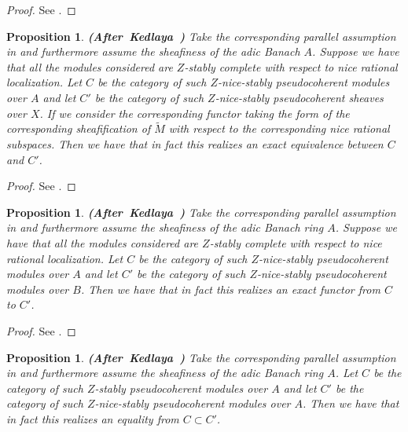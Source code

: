 \documentclass[12pt]{amsart}
\newtheorem{proposition}[theorem]{Proposition}
\theoremstyle{definition}
\numberwithin{equation}{section}
\begin{document}
\begin{proof}
See \cite[Lemma 1.9.13]{Ked2}.	
\end{proof}




\begin{proposition}  \mbox{\bf{(After Kedlaya \cite[Lemma 1.9.16]{Ked2})}}
Take the corresponding parallel assumption in \cite[1.7.1]{Ked2} and furthermore assume the sheafiness of the adic Banach $A$. Suppose we have that all the modules considered are $Z$-stably complete with respect to nice rational localization. Let $C$ be the category of such $Z$-nice-stably pseudocoherent modules over $A$ and let $C'$ be the category of such $Z$-nice-stably pseudocoherent sheaves over $X$. If we consider the corresponding functor taking the form of the corresponding sheafification of $\widetilde{M}$	with respect to the corresponding nice rational subspaces. Then we have that in fact this realizes an exact equivalence between $C$ and $C'$.
\end{proposition}



\begin{proof}
See \cite[Lemma 1.9.16]{Ked2}.	
\end{proof}



\begin{proposition}  \mbox{\bf{(After Kedlaya \cite[Lemma 1.9.17]{Ked2})}}
Take the corresponding parallel assumption in \cite[1.7.1]{Ked2} and furthermore assume the sheafiness of the adic Banach ring $A$. Suppose we have that all the modules considered are $Z$-stably complete with respect to nice rational localization. Let $C$ be the category of such $Z$-nice-stably pseudocoherent modules over $A$ and let $C'$ be the category of such $Z$-nice-stably pseudocoherent modules over $B$. Then we have that in fact this realizes an exact functor from $C$ to $C'$.
\end{proposition}



\begin{proof}
See \cite[Lemma 1.9.17]{Ked2}.	
\end{proof}



\begin{proposition}  \mbox{\bf{(After Kedlaya \cite[Corollary 1.9.18]{Ked2})}}
Take the corresponding parallel assumption in \cite[1.7.1]{Ked2} and furthermore assume the sheafiness of the adic Banach ring $A$. Let $C$ be the category of such $Z$-stably pseudocoherent modules over $A$ and let $C'$ be the category of such $Z$-nice-stably pseudocoherent modules over $A$. Then we have that in fact this realizes an equality from $C\subset C'$.
\end{proposition}
\end{document}
